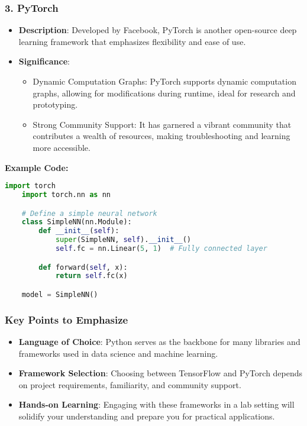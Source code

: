 \documentclass[aspectratio=169]{beamer}
\begin{document}
\begin{frame}[fragile]
    \frametitle{3. PyTorch}
    \begin{itemize}
        \item \textbf{Description}: Developed by Facebook, PyTorch is another open-source deep learning framework that emphasizes flexibility and ease of use.
        
        \item \textbf{Significance}:
        \begin{itemize}
            \item Dynamic Computation Graphs: PyTorch supports dynamic computation graphs, allowing for modifications during runtime, ideal for research and prototyping.
            \item Strong Community Support: It has garnered a vibrant community that contributes a wealth of resources, making troubleshooting and learning more accessible.
        \end{itemize}
    \end{itemize}

    \textbf{Example Code:}
    \begin{lstlisting}[language=Python]
    import torch
    import torch.nn as nn

    # Define a simple neural network
    class SimpleNN(nn.Module):
        def __init__(self):
            super(SimpleNN, self).__init__()
            self.fc = nn.Linear(5, 1)  # Fully connected layer

        def forward(self, x):
            return self.fc(x)

    model = SimpleNN()
    \end{lstlisting}
\end{frame}

\begin{frame}
    \frametitle{Key Points to Emphasize}
    \begin{itemize}
        \item \textbf{Language of Choice}: Python serves as the backbone for many libraries and frameworks used in data science and machine learning.
        \item \textbf{Framework Selection}: Choosing between TensorFlow and PyTorch depends on project requirements, familiarity, and community support.
        \item \textbf{Hands-on Learning}: Engaging with these frameworks in a lab setting will solidify your understanding and prepare you for practical applications.
    \end{itemize}
\end{frame}
\end{document}
